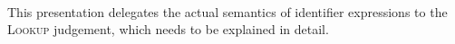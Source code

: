 \begin{Checking}
	\vspace{1em}

	\\
\end{Checking}

\begin{Incomplete}
This presentation delegates the actual semantics of identifier expressions to the \textsc{Lookup} judgement, which needs to be explained in detail.
\end{Incomplete}

%
%
%
%
%
%
%


\begin{Syntax}
           \\
\end{Syntax}

